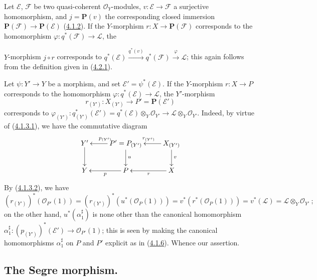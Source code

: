 \begin{env}[4.2.9]
\label{II.4.2.9}
Let $\mathcal{E}$, $\mathcal{F}$ be two quasi-coherent $\mathcal{O}_Y$-modules,
$v:\mathcal{E}\to\mathcal{F}$ a surjective homomorphism, and
$j=\mathbf{P}(v)$ the corresponding closed immersion
$\mathbf{P}(\mathcal{F})\to\mathbf{P}(\mathcal{E})$
(\hyperref[II.4.1.2]{4.1.2}). If the $Y$-morphism
$r:X\to\mathbf{P}(\mathcal{F})$ corresponds to the homomorphism
$\varphi:q^*(\mathcal{F})\to\mathcal{L}$, the


$Y$-morphism $j\circ r$ corresponds to $q^*(\mathcal{E})\xrightarrow{q^*(v)}q^*(\mathcal{F})
\xrightarrow{\varphi}\mathcal{L}$;
this again follows from the definition given in
(\hyperref[II.4.2.1]{4.2.1}).
\end{env}

\begin{env}[4.2.10]
\label{II.4.2.10}
Let $\psi:Y'\to Y$ be a morphism, and set
$\mathcal{E}'=\psi^*(\mathcal{E})$. If the $Y$-morphism $r:X\to P$ corresponds
to the homomorphism $\varphi:q^*(\mathcal{E})\to\mathcal{L}$, the
$Y'$-morphism
\[
  r_{(Y')}:X_{(Y')}\longrightarrow P'=\mathbf{P}(\mathcal{E}')
\]
corresponds to
$\varphi_{(Y')}:q_{(Y')}^*(\mathcal{E}')=
  q^*(\mathcal{E})\otimes_Y\mathcal{O}_{Y'}\to
\mathcal{L}\otimes_Y\mathcal{O}_{Y'}$. Indeed, by virtue of
(\hyperref[II.4.1.3.1]{4.1.3.1}), we have the commutative diagram
\[
  \xymatrix{
    Y' \ar[d]
    & P'=P_{(Y')} \ar[l]_{p_{(Y')}} \ar[d]^{u}
    & X_{(Y')} \ar[l]_{r_{(Y')}} \ar[d]^{v}
    \\Y
    & P \ar[l]^{p}
    & X \ar[l]^{r}
  }
\]
By (\hyperref[II.4.1.3.2]{4.1.3.2}), we have
\[
  (r_{(Y')})^*(\mathcal{O}_{P'}(1))
  =(r_{(Y')})^*(u^*(\mathcal{O}_P(1)))
  =v^*(r^*(\mathcal{O}_P(1)))
  =v^*(\mathcal{L})=\mathcal{L}\otimes_Y\mathcal{O}_{Y'}~;
\]
on the other hand, $u^*(\alpha_1^\sharp)$ is none other than the canonical
homomorphism
$\alpha_1^\sharp:(p_{(Y')})^*(\mathcal{E}')\to\mathcal{O}_{P'}(1)$; this
is seen by making the canonical homomorphisms $\alpha_1^\sharp$ on
$P$ and $P'$ explicit as in (\hyperref[II.4.1.6]{4.1.6}). Whence our assertion.
\end{env}

\subsection{The Segre morphism.}
\label{subsection:II.4.3}


